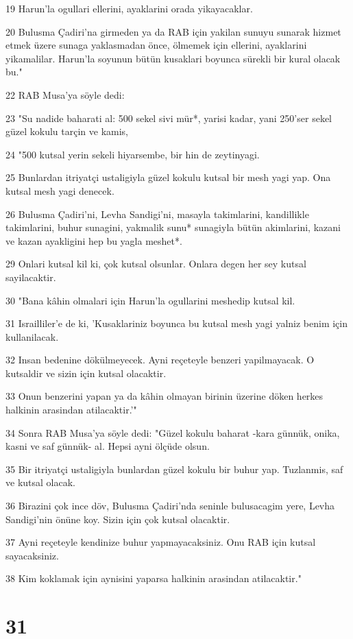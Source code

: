 \par 19 Harun'la ogullari ellerini, ayaklarini orada yikayacaklar.
\par 20 Bulusma Çadiri'na girmeden ya da RAB için yakilan sunuyu sunarak hizmet etmek üzere sunaga yaklasmadan önce, ölmemek için ellerini, ayaklarini yikamalilar. Harun'la soyunun bütün kusaklari boyunca sürekli bir kural olacak bu."
\par 22 RAB Musa'ya söyle dedi:
\par 23 "Su nadide baharati al: 500 sekel sivi mür*, yarisi kadar, yani 250'ser sekel güzel kokulu tarçin ve kamis,
\par 24 "500 kutsal yerin sekeli hiyarsembe, bir hin de zeytinyagi.
\par 25 Bunlardan itriyatçi ustaligiyla güzel kokulu kutsal bir mesh yagi yap. Ona kutsal mesh yagi denecek.
\par 26 Bulusma Çadiri'ni, Levha Sandigi'ni, masayla takimlarini, kandillikle takimlarini, buhur sunagini, yakmalik sunu* sunagiyla bütün akimlarini, kazani ve kazan ayakligini hep bu yagla meshet*.
\par 29 Onlari kutsal kil ki, çok kutsal olsunlar. Onlara degen her sey kutsal sayilacaktir.
\par 30 "Bana kâhin olmalari için Harun'la ogullarini meshedip kutsal kil.
\par 31 Israilliler'e de ki, 'Kusaklariniz boyunca bu kutsal mesh yagi yalniz benim için kullanilacak.
\par 32 Insan bedenine dökülmeyecek. Ayni reçeteyle benzeri yapilmayacak. O kutsaldir ve sizin için kutsal olacaktir.
\par 33 Onun benzerini yapan ya da kâhin olmayan birinin üzerine döken herkes halkinin arasindan atilacaktir.'"
\par 34 Sonra RAB Musa'ya söyle dedi: "Güzel kokulu baharat -kara günnük, onika, kasni ve saf günnük- al. Hepsi ayni ölçüde olsun.
\par 35 Bir itriyatçi ustaligiyla bunlardan güzel kokulu bir buhur yap. Tuzlanmis, saf ve kutsal olacak.
\par 36 Birazini çok ince döv, Bulusma Çadiri'nda seninle bulusacagim yere, Levha Sandigi'nin önüne koy. Sizin için çok kutsal olacaktir.
\par 37 Ayni reçeteyle kendinize buhur yapmayacaksiniz. Onu RAB için kutsal sayacaksiniz.
\par 38 Kim koklamak için aynisini yaparsa halkinin arasindan atilacaktir."

\chapter{31}

